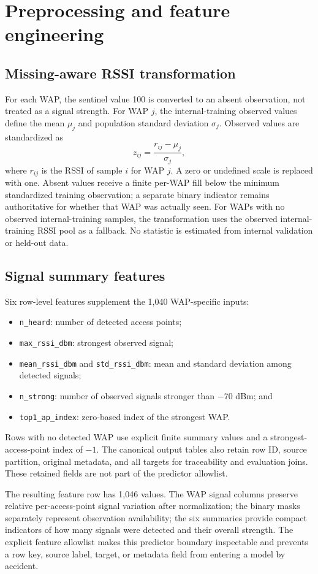 \documentclass[conference]{IEEEtran}
\begin{document}
\section{Preprocessing and feature engineering}
\subsection{Missing-aware RSSI transformation}
For each WAP, the sentinel value 100 is converted to an absent observation, not treated as a signal strength. For WAP \(j\), the internal-training observed values define the mean \(\mu_j\) and population standard deviation \(\sigma_j\). Observed values are standardized as
\[
 z_{ij}=\frac{r_{ij}-\mu_j}{\sigma_j},
\]
where \(r_{ij}\) is the RSSI of sample \(i\) for WAP \(j\). A zero or undefined scale is replaced with one. Absent values receive a finite per-WAP fill below the minimum standardized training observation; a separate binary indicator remains authoritative for whether that WAP was actually seen. For WAPs with no observed internal-training samples, the transformation uses the observed internal-training RSSI pool as a fallback. No statistic is estimated from internal validation or held-out data.

\subsection{Signal summary features}
Six row-level features supplement the 1,040 WAP-specific inputs:
\begin{itemize}
  \item \texttt{n\_heard}: number of detected access points;
  \item \texttt{max\_rssi\_dbm}: strongest observed signal;
  \item \texttt{mean\_rssi\_dbm} and \texttt{std\_rssi\_dbm}: mean and standard deviation among detected signals;
  \item \texttt{n\_strong}: number of observed signals stronger than \(-70\) dBm; and
  \item \texttt{top1\_ap\_index}: zero-based index of the strongest WAP.
\end{itemize}
Rows with no detected WAP use explicit finite summary values and a strongest-access-point index of \(-1\). The canonical output tables also retain row ID, source partition, original metadata, and all targets for traceability and evaluation joins. These retained fields are not part of the predictor allowlist.

The resulting feature row has 1,046 values. The WAP signal columns preserve relative per-access-point signal variation after normalization; the binary masks separately represent observation availability; the six summaries provide compact indicators of how many signals were detected and their overall strength. The explicit feature allowlist makes this predictor boundary inspectable and prevents a row key, source label, target, or metadata field from entering a model by accident.
\end{document}

